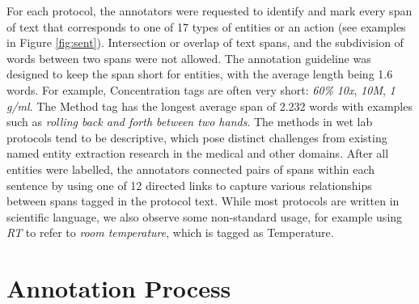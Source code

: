 \documentclass[11pt,a4paper]{article}
\begin{document}


For each protocol, the annotators were requested to identify and mark every span of text that corresponds to one of 17 types of entities or an action (see examples in Figure \ref{fig:sent}). Intersection or overlap of text spans, and the subdivision of words between two spans were not allowed. The annotation guideline was designed to keep the span short for entities, with the average length being 1.6 words. For example,  {\sc Concentration} tags are often very short: \textit{60\%} \textit{10x}, \textit{10M}, \textit{1 g/ml}. The  {\sc Method} tag has the longest average span of 2.232 words with examples such as \textit{rolling back and forth between two hands}. The methods in wet lab protocols tend to be descriptive, which pose distinct challenges from existing named entity extraction research in the medical \cite{doi:10.1093/bioinformatics/btg1023} and other domains. After all entities were labelled, the annotators connected pairs of spans within each sentence by using one of 12 directed links to capture various relationships between spans tagged in the protocol text. While most protocols are written in scientific language, we also observe some non-standard usage, for example using \textit{RT} to refer to \textit{room temperature}, which is tagged as {\sc Temperature}. %









\section{Annotation Process}
\end{document}
